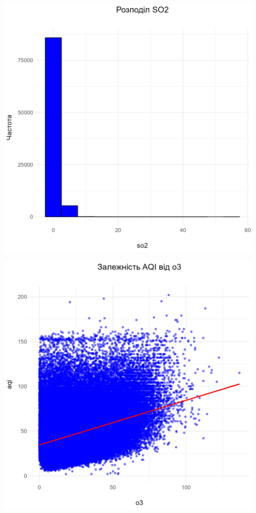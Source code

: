 \documentclass[./report.tex]{subfiles}
\begin{document}
\begin{enumerate}
  \includegraphics[width=6in]{plots/question2/so2_plot.png}

  \includegraphics[width=6in]{plots/question2/scatter_plot.png}


\end{enumerate}
\end{document}
